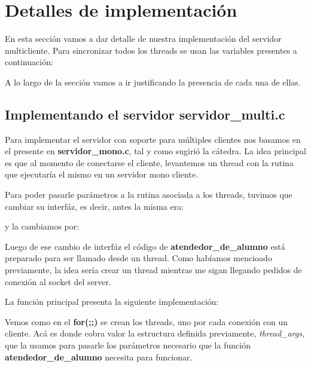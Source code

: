 \section{Detalles de implementaci\'on}
\label{sec:Imp}
En esta secci\'on vamos a dar detalle de nuestra implementaci\'on del servidor multicliente. Para sincronizar todos los threads se usan las variables presentes a continuaci\'on:



A lo largo de la secci\'on vamos a ir justificando la presencia de cada una de ellas.

\subsection{Implementando el servidor \textbf{servidor\_multi.c}}
Para implementar el servidor con soporte para m\'ultiples clientes nos basamos en el presente en \textbf{servidor\_mono.c}, tal y como sugiri\'o la c\'atedra.
La idea principal es que al momento de conectarse el cliente, levantemos un thread con la rutina que ejecutar\'ia el mismo en un servidor mono cliente.

Para poder pasarle par\'ametros a la rutina asociada a los threads, tuvimos que cambiar su interf\'az, es decir, antes la misma era:



y la cambiamos por:



Luego de ese cambio de interf\'az el c\'odigo de \textbf{atendedor\_de\_alumno} est\'a preparado para ser llamado desde un thread. Como hab\'iamos mencioado previamente, la idea ser\'ia crear un thread mientras me sigan llegando pedidos de conexi\'on al socket del server.

La funci\'on principal presenta la siguiente implementaci\'on:



Vemos como en el \textbf{for(;;)} se crean los threads, uno por cada conexi\'on con un cliente. Ac\'a es donde cobra valor la estructura definida previamente, \emph{thread\_args}, que la usamos para pasarle los par\'ametros necesario que la funci\'on \textbf{atendedor\_de\_alumno} necesita para funcionar.

